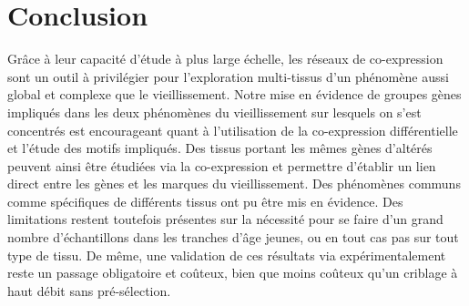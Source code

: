 \section{Conclusion}

Grâce à leur capacité d'étude à plus large échelle, les réseaux de co-expression sont un outil à privilégier pour l'exploration multi-tissus d'un phénomène aussi global et complexe que le vieillissement. Notre mise en évidence de groupes gènes impliqués dans les deux phénomènes du vieillissement sur lesquels on s'est concentrés est encourageant quant à l'utilisation de la co-expression différentielle et l'étude des motifs impliqués. Des tissus portant les mêmes gènes d'altérés peuvent ainsi être étudiées via la co-expression et permettre d'établir un lien direct entre les gènes et les marques du vieillissement. Des phénomènes communs comme spécifiques de différents tissus ont pu être mis en évidence. Des limitations restent toutefois présentes sur la nécessité pour se faire d'un grand nombre d'échantillons dans les tranches d'âge jeunes, ou en tout cas pas sur tout type de tissu. De même, une validation de ces résultats via expérimentalement reste un passage obligatoire et coûteux, bien que moins coûteux qu'un criblage à haut débit sans pré-sélection.






